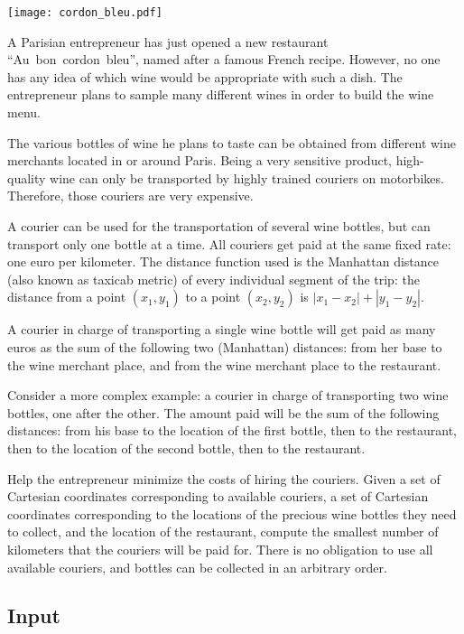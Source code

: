 
\begin{center}
 \texttt{[image: cordon\_bleu.pdf]}
 \end{center}

\noindent
A Parisian entrepreneur has just opened a new restaurant
``Au~bon~cordon~bleu'',
named after a famous French recipe.  However, no one has any
idea of which wine would be appropriate with such a dish. The entrepreneur
plans to sample many different wines in order to build the wine menu.

The various bottles of wine he plans to taste can be obtained from
different wine merchants located in or around Paris. Being a very
sensitive product, high-quality wine can only be transported by highly
trained couriers on motorbikes. Therefore, those couriers are very expensive.

A courier can be used for the transportation of several wine bottles,
but can transport only one bottle at a time. All couriers get paid
at the same fixed rate: one euro per kilometer. The distance function
used is the Manhattan distance (also known as taxicab metric)
of every individual segment of the trip:
the distance from a point $(x_1, y_1)$ to a point $(x_2, y_2)$ is
$|x_1-x_2|+|y_1-y_2|$.

A courier in charge of transporting a single wine bottle will
get paid as many euros as the sum of the following two (Manhattan) distances:
from her base to the wine merchant place, and from the wine merchant
place to the restaurant.

Consider a more complex example: a courier in charge of transporting two wine
bottles, one after the other. The amount paid will be the sum of the
following distances: from his base to the location of the first bottle,
then to the restaurant, then to the location of the second bottle, then to
the restaurant.

Help the entrepreneur
minimize the costs of hiring the couriers. Given a set of Cartesian
coordinates corresponding to available couriers, a set of Cartesian
coordinates corresponding to the locations of the precious wine bottles
they need to collect, and the location of the restaurant,
compute the smallest number of kilometers that the couriers will be
paid for.  There is no obligation to use all available
couriers, and bottles can be collected in an arbitrary order.

\subsection*{Input}


